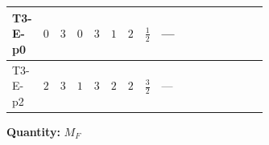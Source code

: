 \documentclass[8pt]{article}
\begin{document}
\begin{landscape}
\begin{longtable}{@{}llcccccc >{\raggedright\arraybackslash}p{0.21\linewidth} >{\raggedright\arraybackslash}p{0.21\linewidth} >{\raggedright\arraybackslash}p{0.21\linewidth}@{}}
\midrule
T3-E-p0 & $0$ & $3$ & $0$ & $3$ & $1$ & $2$ & $\frac{1}{2}$ & --- & \scriptsize\adjustbox{max width=\linewidth}{$\begin{gathered} -\frac{9}{2} {g_2}^2 \left({M_F}\right)_{ij}\end{gathered}$} & \scriptsize\adjustbox{max width=\linewidth}{$\begin{gathered} -\frac{3}{2} {g_1}^2 \left({M_F}\right)_{ij}\end{gathered}$} \\
\midrule
T3-E-p2 & $2$ & $3$ & $1$ & $3$ & $2$ & $2$ & $\frac{3}{2}$ & --- & \scriptsize\adjustbox{max width=\linewidth}{$\begin{gathered} -\frac{9}{2} {g_2}^2 \left({M_F}\right)_{ij}\end{gathered}$} & \scriptsize\adjustbox{max width=\linewidth}{$\begin{gathered} -\frac{27}{2} {g_1}^2 \left({M_F}\right)_{ij}\end{gathered}$} \\
\midrule
\bottomrule
\end{longtable}
\clearpage
\noindent\textbf{Quantity: }$M_F$\par\smallskip

\end{landscape}
\end{document}
